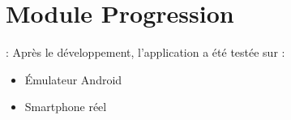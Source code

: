 \documentclass[a4paper,oneside,12pt]{book}
\begin{document}
			\section{Module Progression}:
			Après le développement, l'application a été testée sur :
		\begin{itemize}
			\item [$-$]Émulateur Android
			\item  [$-$]Smartphone réel
		\end{itemize}	
		
	
\end{document}
